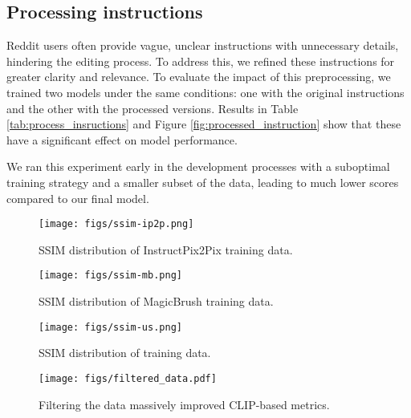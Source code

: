 


\subsection{Processing instructions}
Reddit users often provide vague, unclear instructions with unnecessary details, hindering the editing process. To address this, we refined these instructions for greater clarity and relevance. To evaluate the impact of this preprocessing, we trained two models under the same conditions: one with the original instructions and the other with the processed versions. Results in Table \ref{tab:process_insructions} and Figure \ref{fig:processed_instruction} show that these have a significant effect on model performance. 

We ran this experiment early in the development processes with a suboptimal training strategy and a smaller subset of the data, leading to much lower scores compared to our final model.




\begin{figure}[b]
    \centering
    \texttt{[image: figs/ssim-ip2p.png]}
    \caption{SSIM distribution of InstructPix2Pix training data.}
    \label{fig:ssim-ip2p}
\end{figure}

\begin{figure}[b]
    \centering
    \texttt{[image: figs/ssim-mb.png]}
    \caption{SSIM distribution of MagicBrush training data.}
    \label{fig:ssim-mb}
\end{figure}

\begin{figure}[b]
    \centering
    \texttt{[image: figs/ssim-us.png]}
    \caption{SSIM distribution of \ours training data.}
    \label{fig:ssim-us}
\end{figure}


\begin{figure*}[h]
    \centering
    \texttt{[image: figs/filtered\_data.pdf]}
    \caption{Filtering the data massively improved CLIP-based metrics.}
    \label{fig:filtered_data}
\end{figure*}


